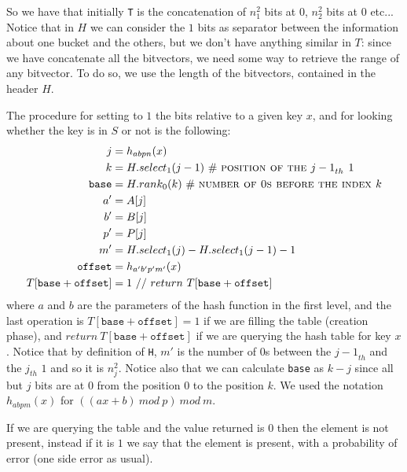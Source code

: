 \documentclass[a4paper]{article}
\begin{document}
So we have that initially \texttt{T} is the concatenation of $n_1^2$ bits at $0$, $n_2^2$ bits at $0$ etc...
Notice that in $H$ we can consider the $1$ bits as separator between the information about one bucket and the others, but we don't have anything similar in $T$: since we have concatenate all the bitvectors, we need some way to retrieve the range of any bitvector.
To do so, we use the length of the bitvectors, contained in the header $H$.

The procedure for setting to $1$ the bits relative to a given key $x$, and for looking whether the key is in $S$ or not is the following:
\begin{align*}
j & = h_{abpn}(x)\\
k & = H.select_1(j - 1)\ \#\ \textsc{position of the ${j-1}_{th}$ 1} \\
\texttt{base} & = H.rank_0(k)\ \#\ \textsc{number of 0s before the index $k$} \\
a' & = A[j] \\
b' & = B[j] \\
p' & = P[j] \\
m' & = H.select_1(j) - H.select_1(j-1) - 1 \\
\texttt{offset} & = h_{a' b' p' m'}(x) \\
T[\texttt{base} + \texttt{offset}] & = 1\ \slash\slash\ return\ T[\texttt{base} + \texttt{offset}] \\
\end{align*}
where $a$ and $b$ are the parameters of the hash function in the first level, and the last operation is $T[\texttt{base} + \texttt{offset}] = 1$ if we are filling the table (creation phase), and $return\ T[\texttt{base} + \texttt{offset}]$ if we are querying the hash table for key $x$.
Notice that by definition of \texttt{H}, $m'$ is the number of $0$s between the ${j-1}_{th}$ and the ${j}_{th}$ $1$ and so it is $n_j^2$.
Notice also that we can calculate \texttt{base} as $k - j$ since all but $j$ bits are at $0$ from the position $0$ to the position $k$.
We used the notation $h_{abpm}(x)$ for $((ax + b)\ mod\ p)\ mod\ m$.

If we are querying the table and the value returned is $0$ then the element is not present, instead if it is $1$ we say that the element is present, with a probability of error (one side error as usual).

\
\end{document}
